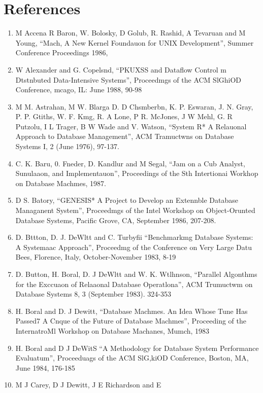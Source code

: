 \documentclass[a4paper,12pt,notitlepage,twoside,openright]{article}
\begin{document}
\section*{References}

\begin{enumerate}
  \item
  M Accena R Baron, W. Bolosky, D Golub, R.
  Rashid, A Tevaruan and M Young, ``Mach, A New
  Kernel Foundauon for UNIX Development'', Summer
  Conference Proceedings 1986,
  \item
  W Alexander and G. Copelsnd, “PKUXSS and
  Dataflow Control m Dtstnbuted Data-Intensive
  Systems”, Proceedmgs of the ACM SlGhiOD
  Conference, mcago, IL: June 1988, 90-98
  \item
  M M. Astrahan, M W. Blarga D. D Chsmberbn,
  K. P. Eswaran, J. N. Gray, P. P. Gtiths, W. F.
  Kmg, R. A Lone, P R. McJones, J W Mehl, G.
  R Putzolu, I L Trager, B W Wade and V.
  Watson, “System R* A Relauonal Approach to
  Database Management”, ACM Tramuctwns on
  Database Systems I, 2 (June 1976), 97-137.
  \item
  C. K. Baru, 0. Fneder, D. Kandlur and M Segal,
  “Jam on a Cub Analyst, Sunulaaon, and
  Implementauon”, Proceedings of the Sth Intertionai
  Workhop on Database Machmes, 1987.
  \item
  D S. Batory, “GENESIS* A Project to Develop an
  Extennble Database Managanent System”,
  Proceedmgs of the Intel Workshop on Object-Orunted
  Database Systems, Pacific Grove, CA, September
  1986, 207-208.
  \item
  D. Bttton, D. J. DeWltt and C. Turbyfii
  “Benchmarkmg Database Systems: A Systemaac
  Approach”, Proceedmg of the Conference on Very
  Large Datu Bees, Florence, Italy, October-November
  1983, 8-19
  \item
  D. Button, H. Boral, D. J DeWltt and W. K.
  Wtlhnson, “Parallel Algonthms for the Exccuaon of
  Relaaonal Database Operatlona”, ACM Trumuctwm
  on Database Systems 8, 3 (September 1983). 324-353
  \item
  H. Boral and D. J Dewitt, “Database Machmes. An
  Idea Whose Tune Has Passed7 A Cnque of the
  Future of Database Machmes”, Proceeding of the
  InternatroMl Workshop on Database Machanes,
  Mumch, 1983
  \item
  H. Boral and D J DeWitS “A Methodology for
  Database System Performance Evaluatum”,
  Proceeduags of the ACM SlG,kiOD Conference,
  Boston, MA, June 1984, 176-185
  \item
  M J Carey, D J Dewitt, J E Richardson and E

\end{enumerate}
\end{document}
